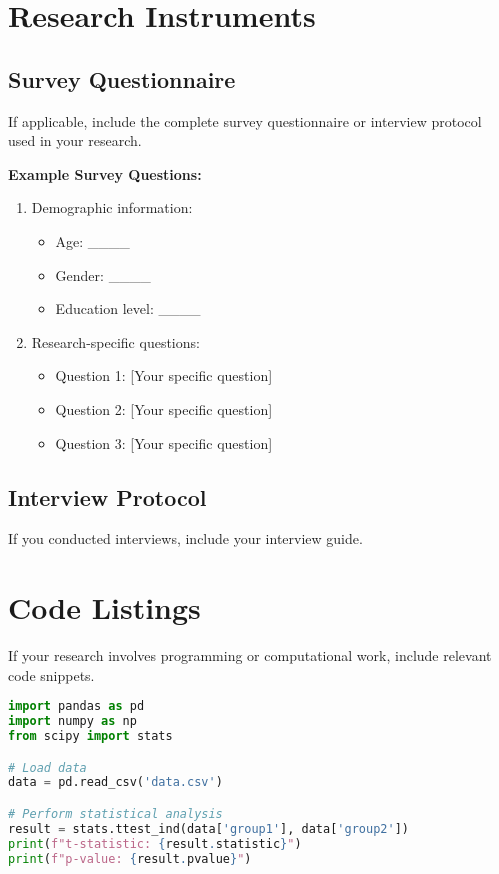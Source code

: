 \section{Research Instruments}

\subsection{Survey Questionnaire}

If applicable, include the complete survey questionnaire or interview protocol used in your research.

\textbf{Example Survey Questions:}

\begin{enumerate}
    \item Demographic information:
    \begin{itemize}
        \item Age: \_\_\_\_
        \item Gender: \_\_\_\_
        \item Education level: \_\_\_\_
    \end{itemize}
    
    \item Research-specific questions:
    \begin{itemize}
        \item Question 1: [Your specific question]
        \item Question 2: [Your specific question]
        \item Question 3: [Your specific question]
    \end{itemize}
\end{enumerate}

\subsection{Interview Protocol}

If you conducted interviews, include your interview guide.

\section{Code Listings}

If your research involves programming or computational work, include relevant code snippets.

\begin{lstlisting}[language=Python, caption=Example data analysis code]
import pandas as pd
import numpy as np
from scipy import stats

# Load data
data = pd.read_csv('data.csv')

# Perform statistical analysis
result = stats.ttest_ind(data['group1'], data['group2'])
print(f"t-statistic: {result.statistic}")
print(f"p-value: {result.pvalue}")
\end{lstlisting}

